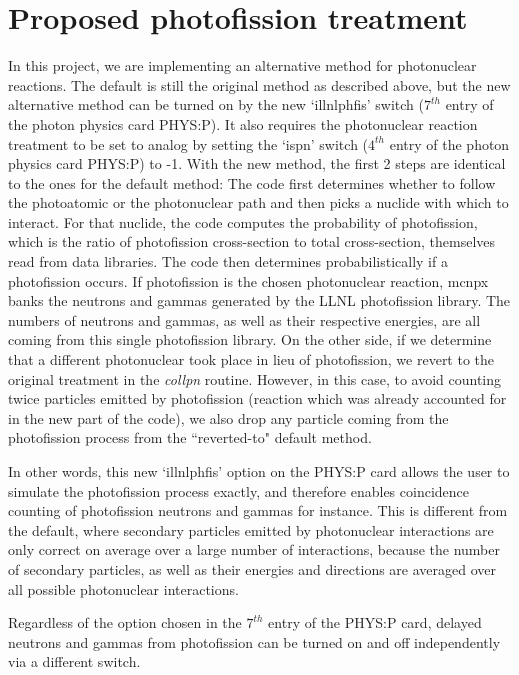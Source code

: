 \documentclass[fleqn,11pt]{article}
\begin{document}
\section{Proposed photofission treatment}
In this project, we are implementing an alternative method for 
photonuclear reactions. The default is still the original 
method as described above, but the new alternative method can 
be turned on by the new `illnlphfis' switch ($7^{th}$ entry of 
the photon physics card PHYS:P). It also requires the photonuclear
reaction treatment to be set to analog by setting the `ispn' 
switch ($4^{th}$ entry of the photon physics card PHYS:P) to -1. 
With the new method, the first
2 steps are identical to the ones for the default method: The 
code first determines whether to follow the photoatomic or 
the photonuclear path and then picks a nuclide with which to
interact. For that nuclide, the code computes the probability 
of photofission, which is the ratio of photofission 
cross-section to total cross-section, themselves read from 
data libraries. 
The code then determines probabilistically if a photofission 
occurs. If photofission is the chosen photonuclear reaction,
mcnpx banks the neutrons and gammas generated by the LLNL 
photofission library. The numbers of neutrons and gammas, 
as well as their respective energies, are all coming from 
this single photofission library. On the other side, if we 
determine that a different photonuclear took place in lieu 
of photofission, we revert to the original treatment in the 
\textit{collpn} routine. However, in this case, 
to avoid counting twice particles emitted by photofission
(reaction which was already accounted for in the new part of 
the code), we also drop any particle coming from the 
photofission process from the ``reverted-to" default method.

In other words, this new `illnlphfis' option on the PHYS:P
card allows the user to simulate the photofission process
exactly, and therefore enables coincidence counting of 
photofission neutrons and gammas for instance. This is
different from the default, where secondary particles
emitted by photonuclear interactions are only correct
on average over a large number of interactions, because
the number of secondary particles, as well as their 
energies and directions are averaged over all possible 
photonuclear interactions.

Regardless of the option chosen in the $7^{th}$ entry
of the PHYS:P card, delayed neutrons and gammas from
photofission can be turned on and off independently 
via a different switch.
\end{document}
